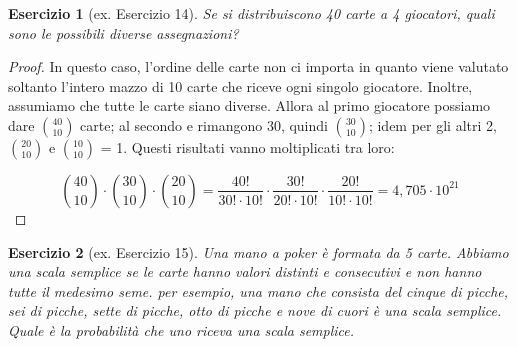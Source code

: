 \documentclass[12pt]{article}
\newtheorem{theorem}{Esercizio}
\begin{document}
\begin{theorem}[ex. Esercizio 14]
Se si distribuiscono 40 carte a 4 giocatori, quali sono le possibili diverse assegnazioni?
\end{theorem}

\begin{proof}
In questo caso, l'ordine delle carte non ci importa in quanto viene valutato soltanto l'intero mazzo di 10 carte che riceve ogni singolo giocatore. Inoltre, assumiamo che tutte le carte siano diverse. Allora al primo giocatore possiamo dare ${40 \choose 10}$ carte; al secondo  e rimangono 30, quindi ${30 \choose 10}$; idem per gli altri 2, ${20 \choose 10}$ e ${10 \choose 10}$ = 1. Questi risultati vanno moltiplicati tra loro:

$$
{40 \choose 10} \cdot {30 \choose 10} \cdot {20 \choose 10} = 
\frac{40!}{30! \cdot 10!} \cdot \frac{30!}{20! \cdot 10!} \cdot \frac{20!}{10! \cdot 10!} = 4,705 \cdot 10^{21} 
$$

\end{proof}

\begin{theorem}[ex. Esercizio 15]
Una mano a poker è formata da 5 carte. Abbiamo una scala semplice se le carte hanno valori distinti e consecutivi e non hanno tutte il medesimo seme. per esempio, una mano che consista del cinque di picche, sei di picche, sette di picche, otto di picche e nove di cuori è una scala semplice. Quale è la probabilità che uno riceva una scala semplice.
\end{theorem}
\end{document}
